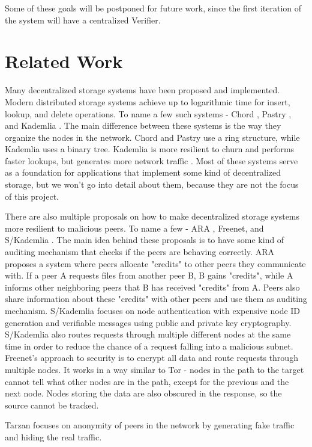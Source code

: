 \documentclass[ twoside,openright,titlepage,numbers=noenddot,headinclude,%
                footinclude=true,cleardoublepage=empty,abstractoff, %
                BCOR=5mm,paper=a4,fontsize=11pt,%
                ngerman,american,%
                ]{scrreprt}
\begin{document}
Some of these goals will be postponed for future work, 
since the first iteration of the system will have a centralized Verifier.


\chapter{Related Work}

Many decentralized storage systems have been proposed and implemented.
Modern distributed storage systems achieve up to logarithmic time for insert, lookup, and delete operations.
To name a few such systems - Chord \cite{chord}, Pastry \cite{pastry}, and Kademlia \cite{kademlia}.
The main difference between these systems is the way they organize the nodes in the network.
Chord and Pastry use a ring structure, while Kademlia uses a binary tree.
Kademlia is more resilient to churn and performs faster lookups, but generates more network traffic \cite{kadvschordvspastry}.
Most of these systems serve as a foundation for applications that implement some kind of decentralized storage,
but we won't go into detail about them, because they are not the focus of this project.

There are also multiple proposals on how to make decentralized storage systems more resilient to malicious peers.
To name a few - ARA \cite{ara}, Freenet, and S/Kademlia \cite{skademlia}.
The main idea behind these proposals is to have some kind of auditing mechanism that checks if the peers are behaving correctly.
ARA proposes a system where peers allocate "credits" to other peers they communicate with.
If a peer A requests files from another peer B, B gains "credits", while A informs other neighboring peers
that B has received "credits" from A.
Peers also share information about these "credits" with other peers and use them as auditing mechanism.
S/Kademlia focuses on node authentication with expensive node ID generation and verifiable messages using
public and private key cryptography.
S/Kademlia also routes requests through multiple different nodes at the same time
in order to reduce the chance of a request falling into a malicious subnet.
Freenet's approach to security is to encrypt all data and route requests through multiple nodes.
It works in a way similar to Tor - nodes in the path to the target cannot tell what other nodes are in the path,
except for the previous and the next node.
Nodes storing the data are also obscured in the response, so the source cannot be tracked.

Tarzan focuses on anonymity of peers in the network by generating fake traffic and hiding the real traffic.
\end{document}
